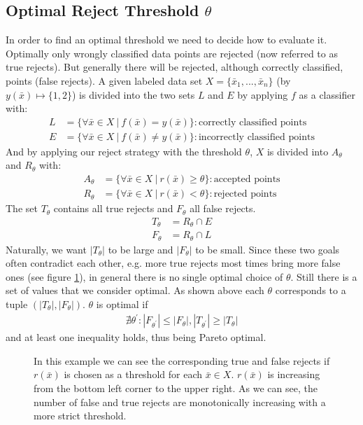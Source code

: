 \subsection{Optimal Reject Threshold $\theta$}
\label{optimalt}
In order to find an optimal threshold we need to decide how to evaluate it. Optimally only wrongly classified data points are rejected (now referred to as true rejects). But generally there will be rejected, although correctly classified, points (false rejects). 
A given labeled data set $X = \{\bar{x}_1,...,\bar{x}_n\}$ (by $y(\bar{x}) \mapsto \{1,2\}$) is divided into the two sets $L$ and $E$ by applying $f$ as a classifier with:
\begin{align} 
L&=\{\forall \bar{x} \in X \ | \ f(\bar{x}) = y(\bar{x})\} : \text{correctly classified points} \\
E&=\{\forall \bar{x} \in X \ | \ f(\bar{x}) \neq y(\bar{x})\} : \text{incorrectly classified points} 
\end{align}
And by applying our reject strategy with the threshold $\theta$, $X$ is divided into $A_\theta$ and $R_\theta$ with:
\begin{align} 
A_\theta&=\{\forall \bar{x} \in X \ | \ r(\bar{x}) \geq \theta \} : \text{accepted points} \\
R_\theta&=\{\forall \bar{x} \in X \ | \ r(\bar{x}) < \theta\} : \text{rejected points} 
\end{align}
The set $T_\theta$ contains all true rejects and $F_\theta$ all false rejects.
\begin{align} 
T_\theta &= R_\theta \cap E \\ 
F_\theta &= R_\theta \cap L
\end{align}
Naturally, we want $|T_\theta|$ to be large and $|F_\theta|$ to be small. Since these two goals often contradict each other, e.g. more true rejects most times bring more false ones (see figure \ref{incTaF}), in general there is no single optimal choice of $\theta$. Still there is a set of values that we consider optimal. As shown above each $\theta$ corresponds to a tuple $(|T_\theta|,|F_\theta|)$. $\theta$ is optimal if
\begin{align}
\nexists \theta^{'} : |F_{\theta^{'}}|\leq|F_\theta|, |T_{\theta^{'}}|\geq|T_\theta|
\end{align}
and at least one inequality holds, thus being Pareto optimal.

\begin{figure}[!htbp]
\centering
\caption{In this example we can see the corresponding true and false rejects if $r(\bar{x})$ is chosen as a threshold for each $\bar{x} \in X$. $r(\bar{x})$ is increasing from the bottom left corner to the upper right. As we can see, the number of false and true rejects are monotonically increasing with a more strict threshold.}
\label{incTaF}
\end{figure}

